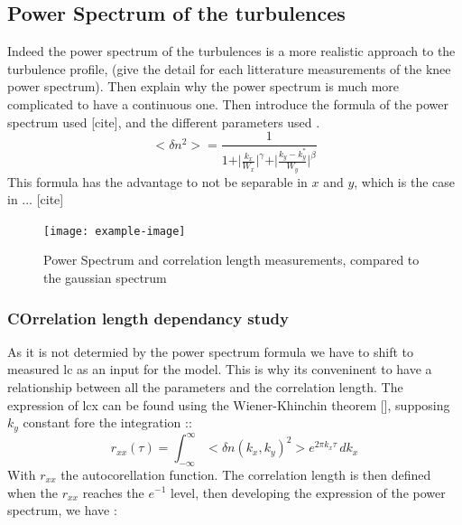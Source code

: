 \documentclass[11pt,a4paper,openany]{report}
\begin{document}
\begin{multicols}{2}
    \subsection{Power Spectrum of the turbulences}
    Indeed the power spectrum of the turbulences is a more realistic approach to the turbulence profile, (give the detail for each litterature measurements of the knee power spectrum). Then explain why the power spectrum is much more complicated to have a continuous one.
    Then introduce the formula of the power spectrum used [cite], and the different parameters used .
    $$<\delta n^2 > = \frac{1}{1 + \vert \frac{k_x}{W_x} \vert^\gamma + \vert \frac{k_y - k_y^*}{W_y}\vert^\beta}$$
    This formula has the advantage to not be separable in $x$ and $y$, which is the case in ... [cite]
    \begin{figure}[H]
        \centering
        \texttt{[image: example-image]}
        \caption{Power Spectrum and correlation length measurements, compared to the gaussian spectrum}
        \label{}
    \end{figure}

    \subsubsection{COrrelation length dependancy study}
    As it is not determied by the power spectrum formula we have to shift to measured lc as an input for the model. This is why its conveninent to have a relationship between all the parameters and the correlation length. The expression of lcx can be found using the Wiener-Khinchin theorem [], supposing $k_y$ constant fore the integration ::
    $$r_{x x}(\tau) = \int_{-\infty}^{\infty} <\delta n(k_x, k_y)^2> e^{2 \pi k_x \tau} \, dk_x$$
    With $r_{x x}$ the autocorellation function. The correlation length is then defined when the $r_{x x}$ reaches the $e^{-1}$ level, then developing the expression of the power spectrum, we have :


\end{multicols}
\end{document}
